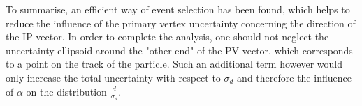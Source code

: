 To summarise, an efficient way of event selection has been found, which helps to reduce the influence of the primary vertex uncertainty concerning the direction of the IP vector. In order to complete the analysis, one should not neglect the uncertainty ellipsoid around the "other end" of the PV vector, which corresponds to a point on the track of the particle. Such an additional term however would only increase the total uncertainty with respect to $\sigma_{d}$ and therefore the influence of $\alpha$ on the distribution $\frac{d}{\sigma_d}$.